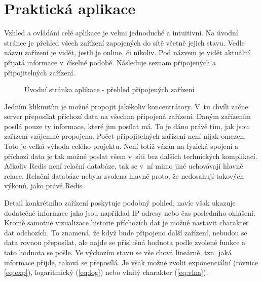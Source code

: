 \chapter{Praktická aplikace}
Vzhled a ovládání celé aplikace je velmi jednoduché a intuitivní. Na úvodní stránce je přehled všech zařízení zapojených do sítě včetně jejich stavu. Vedle názvu zařízení je vidět, jestli je online, či nikoliv. Pod názvem je vidět aktuální přijatá informace v~číselné podobě. Následuje seznam připojených a připojitelných zařízení.

\begin{figure}[H]
    \centering
	\caption{Úvodní stránka aplikace - přehled připojených zařízení}
	\label{fig:speedy1}
\end{figure}

Jedním kliknutím je možné propojit jakékoliv koncentrátory. V~tu chvíli začne server přeposílat příchozí data na všechna připojená zařízení. Daným zařízením posílá pouze ty informace, které jim posílat má. To je dáno právě tím, jak jsou zařízení vzájemně propojena. Počet připojitelných zařízení není nijak omezen. Toto je velká výhoda celého projektu. Není totiž vázán na fyzická spojení a příchozí data je tak možné poslat všem v~síti bez dalších technických komplikací. Ačkoliv Redis \cite{redis} není relační databáze, tak se v~ní mimo jiné uchovávají hlavně relace. Relační databáze nebyla zvolena hlavně proto, že nedosahují takových výkonů, jako právě Redis.

Detail konkrétního zařízení poskytuje podobný pohled, navíc však ukazuje dodatečné informace jako jsou například IP adresy nebo čas posledního ohlášení. Kromě samotné vizualizace historie příchozích dat je možné nastavit charakter dat odchozích. To znamená, že když bude připojeno další zařízení, nebudou se data rovnou přeposílat, ale najde se příslušná hodnota podle zvolené funkce a tato hodnota se pošle. Ve výchozím stavu se vše chová lineárně, tzn. jaká informace přijde, taková se přeposílá. Je však možné zvolit exponenciální (rovnice \ref{eq:exp}), logaritmický (\ref{eq:log}) nebo vlnitý charakter (\ref{eq:vlna}).

